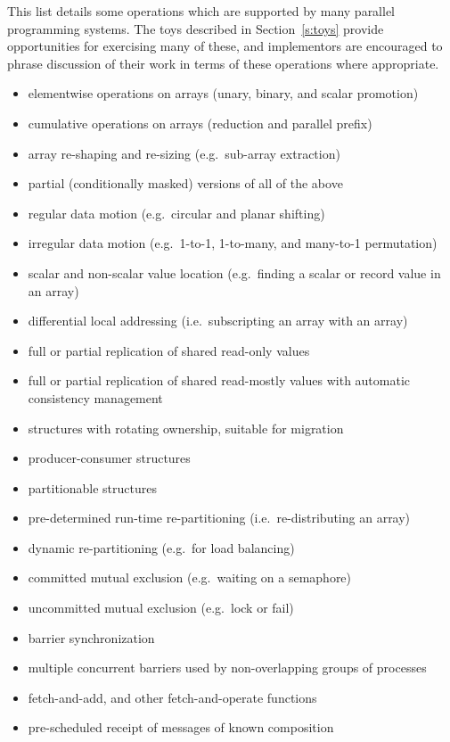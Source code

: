 This list details some operations which are supported by many parallel programming systems.
The toys described in Section~\ref{s:toys} provide opportunities for exercising many of these,
and implementors are encouraged to phrase discussion of their work in terms of these operations where appropriate.

\begin{itemize}
\item	elementwise operations on arrays (unary, binary, and scalar promotion)
\item	cumulative operations on arrays (reduction and parallel prefix)
\item	array re-shaping and re-sizing (e.g.\ sub-array extraction)
\item	partial (conditionally masked) versions of all of the above
\item	regular data motion (e.g.\ circular and planar shifting)
\item	irregular data motion (e.g.\ 1-to-1, 1-to-many, and many-to-1 permutation)
\item	scalar and non-scalar value location (e.g.\ finding a scalar or record value in an array)
\item	differential local addressing (i.e.\ subscripting an array with an array)
\item	full or partial replication of shared read-only values
\item	full or partial replication of shared read-mostly values with automatic consistency management
\item	structures with rotating ownership, suitable for migration
\item	producer-consumer structures
\item	partitionable structures
\item	pre-determined run-time re-partitioning (i.e.\ re-distributing an array)
\item	dynamic re-partitioning (e.g.\ for load balancing)
\item	committed mutual exclusion (e.g.\ waiting on a semaphore)
\item	uncommitted mutual exclusion (e.g.\ lock or fail)
\item	barrier synchronization
\item	multiple concurrent barriers used by non-overlapping groups of processes
\item	fetch-and-add, and other fetch-and-operate functions
\item	pre-scheduled receipt of messages of known composition

\end{itemize}
